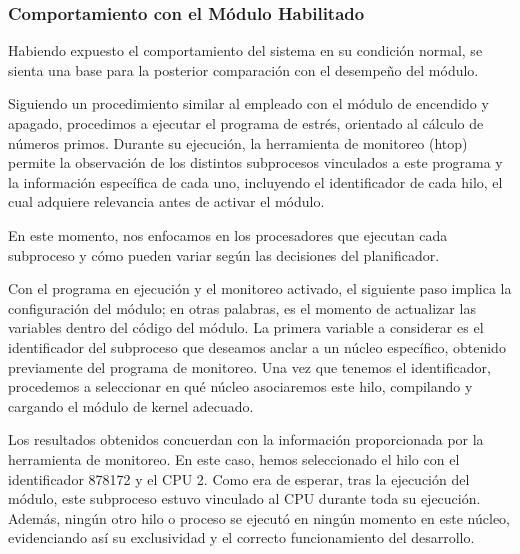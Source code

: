 

\subsubsection{Comportamiento con el Módulo Habilitado}
Habiendo expuesto el comportamiento del sistema en su condición normal, se sienta una base para la posterior comparación con el desempeño del módulo.\par

Siguiendo un procedimiento similar al empleado con el módulo de encendido y apagado, procedimos a ejecutar el programa de estrés, orientado al cálculo de números primos. Durante su ejecución, la herramienta de monitoreo (htop) permite la observación de los distintos subprocesos vinculados a este programa y la información específica de cada uno, incluyendo el identificador de cada hilo, el cual adquiere relevancia antes de activar el módulo.\par

En este momento, nos enfocamos en los procesadores que ejecutan cada subproceso y cómo pueden variar según las decisiones del planificador.


Con el programa en ejecución y el monitoreo activado, el siguiente paso implica la configuración del módulo; en otras palabras, es el momento de actualizar las variables dentro del código del módulo. La primera variable a considerar es el identificador del subproceso que deseamos anclar a un núcleo específico, obtenido previamente del programa de monitoreo. Una vez que tenemos el identificador, procedemos a seleccionar en qué núcleo asociaremos este hilo, compilando y cargando el módulo de kernel adecuado.\par

Los resultados obtenidos concuerdan con la información proporcionada por la  herramienta de monitoreo. En este caso, hemos seleccionado el hilo con el identificador  878172 y el CPU 2. Como era de esperar, tras la ejecución del módulo, este subproceso estuvo vinculado al CPU durante toda su ejecución. Además, ningún otro hilo o proceso se ejecutó en ningún momento en este núcleo, evidenciando así su exclusividad y el correcto funcionamiento del desarrollo.\par

